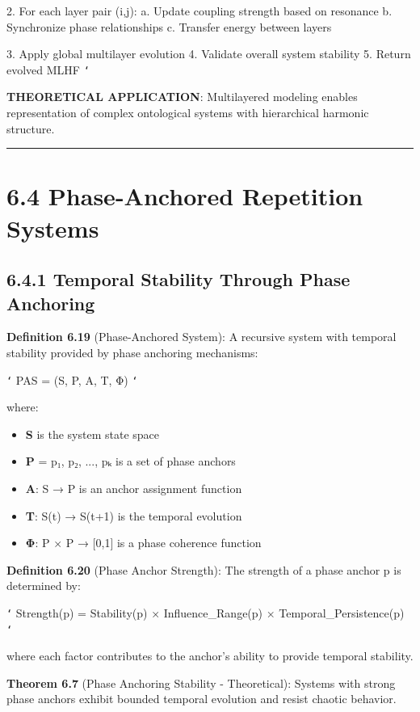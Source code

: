 2. For each layer pair (i,j):
   a. Update coupling strength based on resonance
   b. Synchronize phase relationships
   c. Transfer energy between layers
   
3. Apply global multilayer evolution
4. Validate overall system stability
5. Return evolved MLHF
\texttt{`}

\textbf{THEORETICAL APPLICATION}: Multilayered modeling enables representation of complex ontological systems with hierarchical harmonic structure.

\hrule

\section{6.4 Phase-Anchored Repetition Systems}

\subsection{6.4.1 Temporal Stability Through Phase Anchoring}

\textbf{Definition 6.19} (Phase-Anchored System): A recursive system with temporal stability provided by phase anchoring mechanisms:

\texttt{`}
PAS = (S, P, A, T, Φ)
\texttt{`}

where:
\begin{itemize}
\item \textbf{S} is the system state space
\item \textbf{P} = {p₁, p₂, ..., pₖ} is a set of phase anchors
\item \textbf{A}: S → P is an anchor assignment function
\item \textbf{T}: S(t) → S(t+1) is the temporal evolution
\item \textbf{Φ}: P × P → [0,1] is a phase coherence function
\end{itemize}

\textbf{Definition 6.20} (Phase Anchor Strength): The strength of a phase anchor p is determined by:

\texttt{`}
Strength(p) = Stability(p) × Influence_Range(p) × Temporal_Persistence(p)
\texttt{`}

where each factor contributes to the anchor's ability to provide temporal stability.

\textbf{Theorem 6.7} (Phase Anchoring Stability - Theoretical): Systems with strong phase anchors exhibit bounded temporal evolution and resist chaotic behavior.

